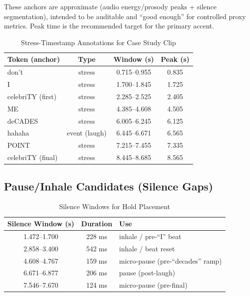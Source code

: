 \documentclass[11pt,a4paper]{article}
\begin{document}
These anchors are approximate (audio energy/prosody peaks + silence segmentation), intended to be auditable and ``good enough'' for controlled proxy metrics. Peak time is the recommended target for the primary accent.

\begin{table}[H]
\centering
\caption{Stress-Timestamp Annotations for Case Study Clip}
\label{tab:stress-timestamps}
\begin{tabular}{@{}lccc@{}}
\toprule
\textbf{Token (anchor)} & \textbf{Type} & \textbf{Window (s)} & \textbf{Peak (s)} \\
\midrule
don't & stress & 0.715--0.955 & 0.835 \\
I & stress & 1.700--1.845 & 1.725 \\
celebriTY (first) & stress & 2.285--2.525 & 2.405 \\
ME & stress & 4.385--4.608 & 4.505 \\
deCADES & stress & 6.005--6.245 & 6.125 \\
hahaha & event (laugh) & 6.445--6.671 & 6.565 \\
POINT & stress & 7.215--7.455 & 7.335 \\
celebriTY (final) & stress & 8.445--8.685 & 8.565 \\
\bottomrule
\end{tabular}
\end{table}

\subsection{Pause/Inhale Candidates (Silence Gaps)}

\begin{table}[H]
\centering
\caption{Silence Windows for Hold Placement}
\label{tab:silence-windows}
\begin{tabular}{@{}ccp{5cm}@{}}
\toprule
\textbf{Silence Window (s)} & \textbf{Duration} & \textbf{Use} \\
\midrule
1.472--1.700 & 228 ms & inhale / pre-``I'' beat \\
2.858--3.400 & 542 ms & inhale / beat reset \\
4.608--4.767 & 159 ms & micro-pause (pre-``decades'' ramp) \\
6.671--6.877 & 206 ms & pause (post-laugh) \\
7.546--7.670 & 124 ms & micro-pause (pre-final) \\
\bottomrule
\end{tabular}
\end{table}
\end{document}
